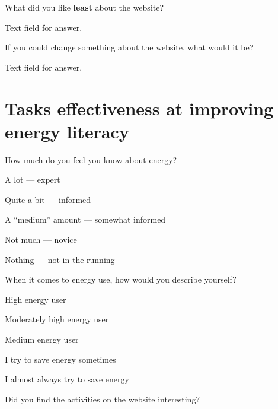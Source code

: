\begin{question}
	\item What did you like \textbf{least} about the website?
\end{question}

Text field for answer.

\begin{question}
	\item If you could change something about the website, what would it be?
\end{question}

Text field for answer.

\section{Tasks effectiveness at improving energy literacy}

\begin{question}
	\item How much do you feel you know about energy?
\end{question}

\begin{answer}
	\item A lot --- expert
	\item Quite a bit --- informed
	\item A ``medium'' amount --- somewhat informed
	\item Not much --- novice
	\item Nothing --- not in the running
\end{answer}

\begin{question}
	\item When it comes to energy use, how would you describe yourself?
\end{question}

\begin{answer}
	\item High energy user
	\item Moderately high energy user
	\item Medium energy user
	\item I try to save energy sometimes
	\item I almost always try to save energy
\end{answer}

\begin{question}
	\item Did you find the activities on the website interesting?
\end{question}

